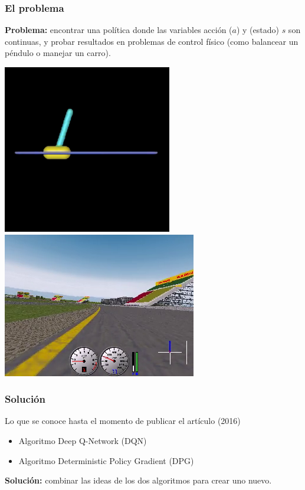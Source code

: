 \documentclass[
    11pt,
    aspectratio=169,
]{beamer}
\begin{document}
\begin{frame}
\frametitle{El problema}

\textbf{Problema:} encontrar una política donde las variables acción ($a$) y (estado) $s$ son continuas, y probar resultados en problemas de control físico (como balancear un péndulo o manejar un carro).

\begin{center}
\includegraphics[scale=0.4]{Images/cartpole}
\includegraphics[scale=0.4]{Images/car_driving}
\end{center}

\end{frame}

\begin{frame}
\frametitle{Solución}

Lo que se conoce hasta el momento de publicar el artículo (2016)

\begin{itemize}
\item Algoritmo Deep Q-Network (DQN)
\item Algoritmo Deterministic Policy Gradient (DPG)
\end{itemize}

\pause

\textbf{Solución:} combinar las ideas de los dos algoritmos para crear uno nuevo.

\end{frame}
\end{document}
